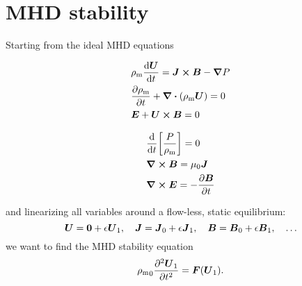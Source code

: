 \documentclass[11pt,a4paper, 
swedish, english %
]{article}
\newcommand{\rhom}{\ensuremath{{\rho_{\text{m}}}}}
\begin{document}
\section{MHD stability}
Starting from the ideal MHD equations
\vspace{-22pt}
\begin{multicols}{2}
\begin{subequations}
\begin{align}
\label{eq:MHD-a}
&\rhom\dv{\vb*U}{t}=\vb*J\cross\vb*B-\grad P
\\ \label{eq:MHD-b}
&\pdv{\rhom}{t} +\div(\rhom\vb*U)=0
\\ \label{eq:MHD-c}
&\vb*E+\vb*U\cross\vb*B=0
\end{align}
\end{subequations}

\columnbreak

\addtocounter{equation}{-1}
\begin{subequations}
\addtocounter{equation}{3}
\begin{align}
\label{eq:MHD-d}
&\dv{t}\qty[\frac{P}{\rhom}]=0
\\ \label{eq:MHD-e}
&\curl\vb*B=\mu_0\vb*J %
\\ \label{eq:MHD-f}
&\curl\vb*E=-\pdv{\vb*B}{t}
\end{align}
\end{subequations}
\end{multicols}
and linearizing all variables around a flow-less, static equilibrium:
\begin{equation}
\vb*U=\vb0+\epsilon\vb*U_1 \qc
\vb*J=\vb*J_0+\epsilon\vb*J_1 \qc
\vb*B=\vb*B_0+\epsilon\vb*B_1 \qc
\ldots
\end{equation}
we want to find the MHD stability equation
\begin{equation}
\rhom_0\pdv[2]{\vb*U_1}{t}=\vb*F(\vb*U_1).
\end{equation}
\end{document}
